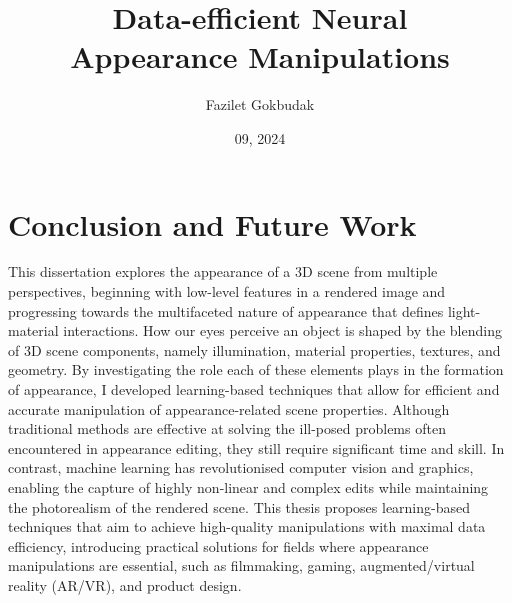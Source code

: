 \documentclass[withindex, glossary]{cam-thesis}
\title{Data-efficient Neural\\
Appearance Manipulations}
\author{Fazilet Gokbudak}
\date{09, 2024}
\begin{document}
\frontmatter{}












\chapter{Conclusion and Future Work}
This dissertation explores the appearance of a 3D scene from multiple perspectives, beginning with low-level features in a rendered image and progressing towards the multifaceted nature of appearance that defines light-material interactions. How our eyes perceive an object is shaped by the blending of 3D scene components, namely illumination, material properties, textures, and geometry. By investigating the role each of these elements plays in the formation of appearance, I developed learning-based techniques that allow for efficient and accurate manipulation of appearance-related scene properties. Although traditional methods are effective at solving the ill-posed problems often encountered in appearance editing, they still require significant time and skill. In contrast, machine learning has revolutionised computer vision and graphics, enabling the capture of highly non-linear and complex edits while maintaining the photorealism of the rendered scene. This thesis proposes learning-based techniques that aim to achieve high-quality manipulations with maximal data efficiency, introducing practical solutions for fields where appearance manipulations are essential, such as filmmaking, gaming, augmented/virtual reality (\gls{AR/VR}), and product design.
\end{document}
